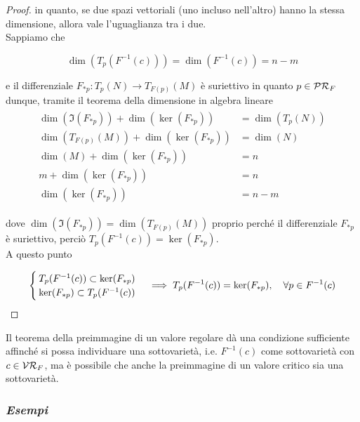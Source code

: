 \begin{proof}
	in quanto, se due spazi vettoriali (uno incluso nell'altro) hanno la stessa dimensione, allora vale l'uguaglianza tra i due.\\
	Sappiamo che
	
	\begin{equation}
		\dim(T_{p}(F^{-1}(c))) = \dim(F^{-1}(c)) = n-m
	\end{equation}

	e il differenziale $ F_{*p} : T_{p}(N) \to T_{F(p)}(M) $ è suriettivo in quanto $ p \in \mathcal{PR}_{F} $ dunque, tramite il teorema della dimensione in algebra lineare
	\begin{align}
		\begin{split}
			\dim(\Im(F_{*p})) + \dim(\ker(F_{*p})) &= \dim(T_{p}(N))\\
			\dim(T_{F(p)}(M)) + \dim(\ker(F_{*p})) &= \dim(N)\\
			\dim(M) + \dim(\ker(F_{*p})) &= n\\
			m + \dim(\ker(F_{*p})) &= n\\
			\dim(\ker(F_{*p})) &= n-m
		\end{split}		
	\end{align}

	dove $ \dim(\Im(F_{*p})) = \dim(T_{F(p)}(M)) $ proprio perché il differenziale $ F_{*p} $ è suriettivo, perciò $ T_{p}(F^{-1}(c)) = \ker(F_{*p}) $.\\
	A questo punto
	
	\begin{equation}
		\begin{cases}
			T_{p}(F^{-1}(c)) \subset \ker(F_{*p})\\
			\ker(F_{*p}) \subset T_{p}(F^{-1}(c))
		\end{cases}%
		\implies %
		T_{p}(F^{-1}(c)) = \ker(F_{*p}) \qcomma \forall p \in F^{-1}(c)
	\end{equation}
\end{proof}

\begin{remark}
	Il teorema della preimmagine di un valore regolare dà una condizione sufficiente affinché si possa individuare una sottovarietà, i.e. $ F^{-1}(c) $ come sottovarietà con $ c \in \mathcal{VR}_{F} $, ma è possibile che anche la preimmagine di un valore critico sia una sottovarietà.
\end{remark}

\subsubsection{\textit{Esempi}}


